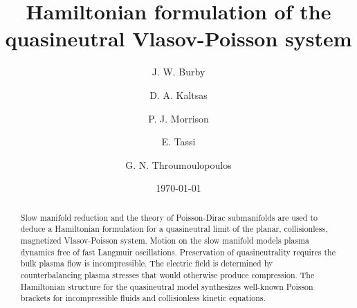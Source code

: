 \documentclass[%
 aip,
 amsmath,amssymb,
reprint, onecolumn %
]{revtex4-1}
\begin{document}

\title{Hamiltonian formulation of the quasineutral Vlasov-Poisson system}
\author{J. W. Burby}
%
\author{D. A. Kaltsas}
\author{P. J. Morrison}
\author{E. Tassi}
\author{G. N. Throumoulopoulos}


\date{\today}%

\begin{abstract}
Slow manifold reduction and the theory of Poisson-Dirac submanifolds are used to deduce a Hamiltonian formulation for a quasineutral limit of the planar, collisionless, magnetized Vlasov-Poisson system. Motion on the slow manifold models plasma dynamics free of fast Langmuir oscillations. Preservation of quasineutrality requires the bulk plasma flow is incompressible. The electric field is determined by counterbalancing plasma stresses that would otherwise produce compression. The Hamiltonian structure for the quasineutral model synthesizes well-known Poisson brackets for incompressible fluids and collisionless kinetic equations. 
\end{abstract}
\end{document}
